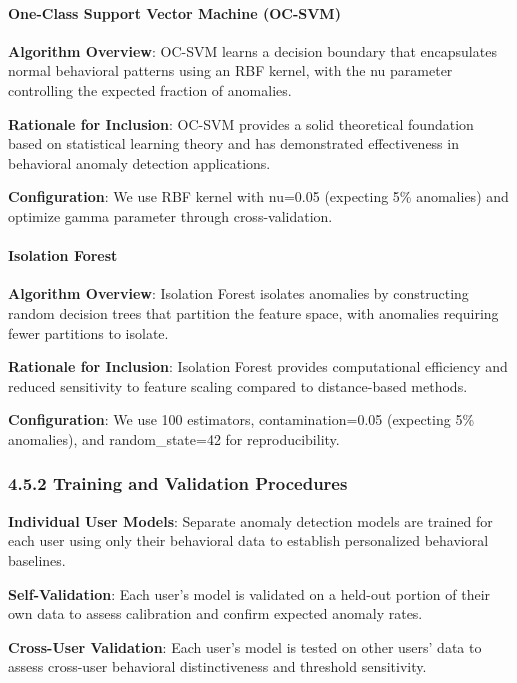 \documentclass[
  11pt,
  a4paper,
]{article}
\begin{document}
\paragraph{One-Class Support Vector Machine
(OC-SVM)}\label{one-class-support-vector-machine-oc-svm}

\textbf{Algorithm Overview}: OC-SVM learns a decision boundary that
encapsulates normal behavioral patterns using an RBF kernel, with the nu
parameter controlling the expected fraction of anomalies.

\textbf{Rationale for Inclusion}: OC-SVM provides a solid theoretical
foundation based on statistical learning theory and has demonstrated
effectiveness in behavioral anomaly detection applications.

\textbf{Configuration}: We use RBF kernel with nu=0.05 (expecting 5\%
anomalies) and optimize gamma parameter through cross-validation.

\paragraph{Isolation Forest}\label{isolation-forest}

\textbf{Algorithm Overview}: Isolation Forest isolates anomalies by
constructing random decision trees that partition the feature space,
with anomalies requiring fewer partitions to isolate.

\textbf{Rationale for Inclusion}: Isolation Forest provides
computational efficiency and reduced sensitivity to feature scaling
compared to distance-based methods.

\textbf{Configuration}: We use 100 estimators, contamination=0.05
(expecting 5\% anomalies), and random\_state=42 for reproducibility.

\subsubsection{4.5.2 Training and Validation
Procedures}\label{training-and-validation-procedures-1}

\textbf{Individual User Models}: Separate anomaly detection models are
trained for each user using only their behavioral data to establish
personalized behavioral baselines.

\textbf{Self-Validation}: Each user's model is validated on a held-out
portion of their own data to assess calibration and confirm expected
anomaly rates.

\textbf{Cross-User Validation}: Each user's model is tested on other
users' data to assess cross-user behavioral distinctiveness and
threshold sensitivity.
\end{document}
